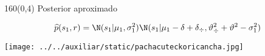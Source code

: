 \documentclass[shownotes,aspectratio=169]{beamer}
\begin{document}
\begin{frame}[plain]
\begin{textblock}{160}(0,4)
 \centering \Large Posterior aproximado
\end{textblock}
\begin{equation*}
 \widehat{p}(s_1, r) = \N(s_1|\mu_1, \sigma_1^2) \N(s_1| \mu_1 - \delta + \delta_{\div}, \vartheta_{\div}^2 + \vartheta^2 - \sigma_1^2)
\end{equation*}
\end{frame}


\begin{frame}[plain]
\centering
  \texttt{[image: ../../auxiliar/static/pachacuteckoricancha.jpg]}
\end{frame}
\end{document}
